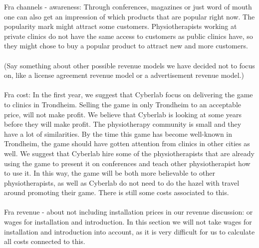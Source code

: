 Fra channels - awareness: Through conferences, magazines or just word of mouth one can also get an impression of which products that are popular right now. The popularity mark might attract some customers. Physiotherapists working at private clinics do not have the same access to customers as public clinics have, so they might chose to buy a popular product to attract new and more customers.  
\\ \\ 
(Say something about other possible revenue models we have decided not to focus on, like a license agreement revenue model or a advertisement revenue model.) \\ \\
Fra cost:
In the first year, we suggest that Cyberlab focus on delivering the game to clinics in Trondheim. Selling the game in only Trondheim to an acceptable price, will not make profit. We believe that Cyberlab is looking at some years before they will make profit. The physiotherapy community is small and they have a lot of similarities. By the time this game has become well-known in Trondheim, the game should have gotten attention from clinics in other cities as well. We suggest that Cyberlab hire some of the physiotherapists that are already using the game to present it on conferences and teach other physiotherapist how to use it. In this way, the game will be both more believable to other physiotherapists, as well as Cyberlab do not need to do the hazel with travel around promoting their game. There is still some costs associated to this.\\ \\
Fra revenue - about not including installation prices in our revenue discussion:  or wages for installation and introduction. In this section we will not take wages for installation and introduction into account, as it is very difficult for us to calculate all costs connected to this.
